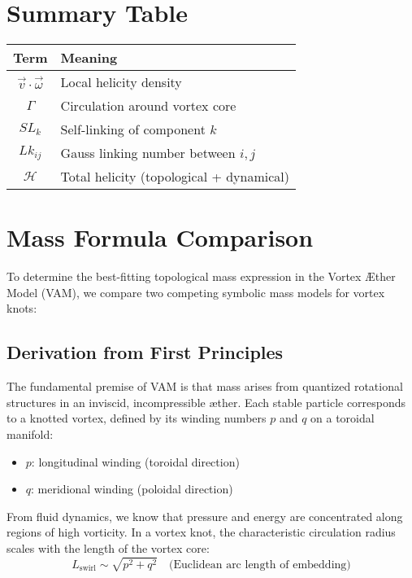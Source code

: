\documentclass[12pt]{article}
\begin{document}
    \section*{Summary Table}
    \begin{tabular}{|c|l|}
        \hline
        \textbf{Term} & \textbf{Meaning} \\
        \hline
        $\vec{v} \cdot \vec{\omega}$ & Local helicity density \\
        $\Gamma$ & Circulation around vortex core \\
        $SL_k$ & Self-linking of component $k$ \\
        $Lk_{ij}$ & Gauss linking number between $i,j$ \\
        $\mathcal{H}$ & Total helicity (topological + dynamical) \\
        \hline
    \end{tabular}


    \section{Mass Formula Comparison}
    To determine the best-fitting topological mass expression in the Vortex \AE{}ther Model (VAM), we compare two competing symbolic mass models for vortex knots:

    \subsection{Derivation from First Principles}
    The fundamental premise of VAM is that mass arises from quantized rotational structures in an inviscid, incompressible \ae{}ther. Each stable particle corresponds to a knotted vortex, defined by its winding numbers \(p\) and \(q\) on a toroidal manifold:
    \begin{itemize}
        \item \(p\): longitudinal winding (toroidal direction)
        \item \(q\): meridional winding (poloidal direction)
    \end{itemize}

    From fluid dynamics, we know that pressure and energy are concentrated along regions of high vorticity. In a vortex knot, the characteristic circulation radius scales with the length of the vortex core:
    \begin{equation}
        L_{\text{swirl}} \sim \sqrt{p^2 + q^2} \quad \text{(Euclidean arc length of embedding)}
    \end{equation}
\end{document}
